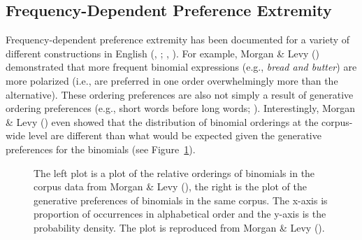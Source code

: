 \documentclass[
  12pt,
  letterpaper,
]{scrreport}
\begin{document}
\subsection{Frequency-Dependent Preference
Extremity}\label{frequency-dependent-preference-extremity}

Frequency-dependent preference extremity has been documented for a
variety of different constructions in English
(,
;
,
).
For example, Morgan \& Levy ()
demonstrated that more frequent binomial expressions (e.g.,
\emph{bread and butter}) are more polarized (i.e., are preferred in one
order overwhelmingly more than the alternative). These ordering
preferences are also not simply a result of generative ordering
preferences (e.g., short words before long words;
). Interestingly, Morgan \& Levy
()
even showed that the distribution of binomial orderings at the
corpus-wide level are different than what would be expected given the
generative preferences for the binomials (see
Figure~\ref{fig-corpusplot1}).

\begin{figure}[htbp]

\caption{\label{fig-corpusplot1}The left plot is a plot of the relative
orderings of binomials in the corpus data from Morgan \& Levy
(), the right is the plot of the
generative preferences of binomials in the same corpus. The x-axis is
proportion of occurrences in alphabetical order and the y-axis is the
probability density. The plot is reproduced from Morgan \& Levy
().}


\end{figure}%
\end{document}
